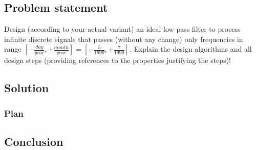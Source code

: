 \documentclass[a4paper]{article}
\theoremstyle{break}
\theoremstyle{break}
\begin{document}
\subsection*{Problem statement}

Design (according to your actual variant) an ideal low-pass filter to process infinite discrete signals that passes (without any change) only frequencies in range $\left[ -\frac{day}{year}, + \frac{month}{year} \right] = \left[ -\frac{5}{1999}, + \frac{7}{1999} \right]$. Explain the design algorithms and all design steps (providing references to the properties justifying the steps)!

\subsection*{Solution}

\subsubsection*{Plan}

\subsection*{Conclusion}

\end{document}
